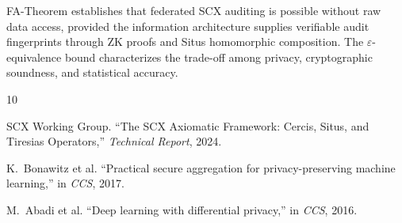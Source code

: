 \documentclass[12pt,a4paper]{article}
\begin{document}
FA-Theorem establishes that federated \textsf{SCX} auditing is possible without raw data access, provided the information architecture supplies verifiable audit fingerprints through ZK proofs and Situs homomorphic composition. The $\varepsilon$-equivalence bound characterizes the trade-off among privacy, cryptographic soundness, and statistical accuracy.


\begin{thebibliography}{10}

SCX Working Group.
\newblock ``The \textsf{SCX} Axiomatic Framework: Cercis, Situs, and Tiresias Operators,''
\newblock \emph{Technical Report}, 2024.

K.~Bonawitz et al.
\newblock ``Practical secure aggregation for privacy-preserving machine learning,''
\newblock in \emph{CCS}, 2017.

M.~Abadi et al.
\newblock ``Deep learning with differential privacy,''
\newblock in \emph{CCS}, 2016.

\end{thebibliography}
\end{document}
